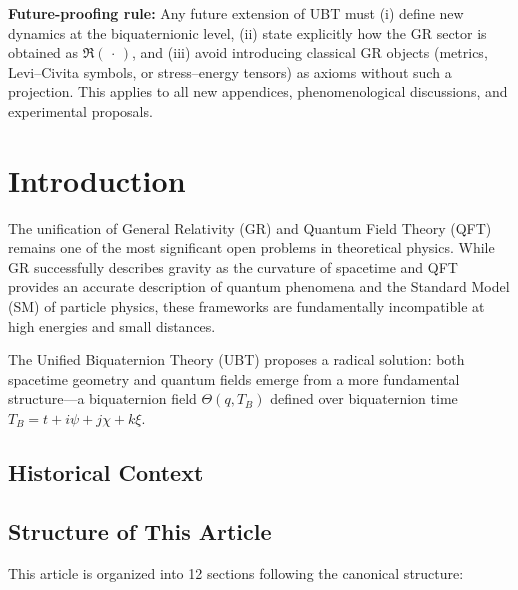 \documentclass[12pt,a4paper]{article}
\begin{document}
\vspace{0.5em}

\noindent\textbf{Future-proofing rule:} Any future extension of UBT must (i) define new dynamics at the biquaternionic level, (ii) state explicitly how the GR sector is obtained as $\Re(\,\cdot\,)$, and (iii) avoid introducing classical GR objects (metrics, Levi--Civita symbols, or stress--energy tensors) as axioms without such a projection. This applies to all new appendices, phenomenological discussions, and experimental proposals.

\vspace{1em}

\tableofcontents


\section{Introduction}
\label{sec:introduction}


The unification of General Relativity (GR) and Quantum Field Theory (QFT) remains one of the most significant open problems in theoretical physics. While GR successfully describes gravity as the curvature of spacetime and QFT provides an accurate description of quantum phenomena and the Standard Model (SM) of particle physics, these frameworks are fundamentally incompatible at high energies and small distances.

The Unified Biquaternion Theory (UBT) proposes a radical solution: both spacetime geometry and quantum fields emerge from a more fundamental structure—a biquaternion field $\Theta(q,T_B)$ defined over biquaternion time $T_B = t + i\psi + j\chi + k\xi$.

\subsection{Historical Context}


\subsection{Structure of This Article}

This article is organized into 12 sections following the canonical structure:
\end{document}
